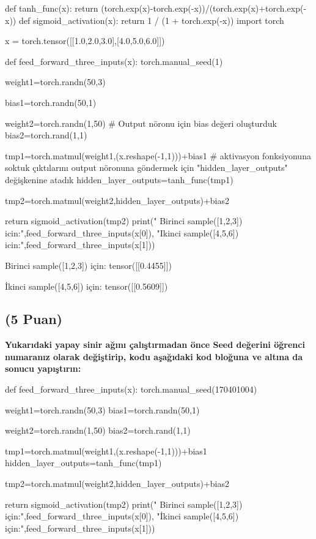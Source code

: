 \documentclass[11pt]{article}
\begin{document}
\begin{python}
def tanh_func(x):
    return (torch.exp(x)-torch.exp(-x))/(torch.exp(x)+torch.exp(-x))
def sigmoid_activation(x):
    return 1 / (1 + torch.exp(-x))
import torch


x = torch.tensor([[1.0,2.0,3.0],[4.0,5.0,6.0]])

def feed_forward_three_inputs(x):
    torch.manual_seed(1)
    
    
    weight1=torch.randn(50,3)
    
    bias1=torch.randn(50,1)
    
    
    weight2=torch.randn(1,50)
    # Output nöronu için bias değeri oluşturduk
    bias2=torch.rand(1,1)
    
    
    tmp1=torch.matmul(weight1,(x.reshape(-1,1)))+bias1
    # aktivasyon fonksiyonuna soktuk çıktılarını output nöronuna göndermek için "hidden_layer_outputs" değişkenine atadık
    hidden_layer_outputs=tanh_func(tmp1)
    
    
    tmp2=torch.matmul(weight2,hidden_layer_outputs)+bias2
    
    return sigmoid_activation(tmp2)
print(" Birinci sample([1,2,3]) icin:",feed_forward_three_inputs(x[0]), "\n Ikinci  sample([4,5,6]) icin:",feed_forward_three_inputs(x[1]))

\end{python}

\item Birinci sample([1,2,3]) için: tensor([[0.4455]]) 
 \item İkinci  sample([4,5,6]) için: tensor([[0.5609]])

\subsection{(5 Puan)} \textbf{Yukarıdaki yapay sinir ağını çalıştırmadan önce Seed değerini öğrenci numaranız olarak değiştirip, kodu aşağıdaki kod bloğuna ve altına da sonucu yapıştırın:}

\begin{python}
def feed_forward_three_inputs(x):
    torch.manual_seed(170401004)
    

    weight1=torch.randn(50,3)
    bias1=torch.randn(50,1)
    

    weight2=torch.randn(1,50)
    bias2=torch.rand(1,1)

    tmp1=torch.matmul(weight1,(x.reshape(-1,1)))+bias1
    hidden_layer_outputs=tanh_func(tmp1)
    
    tmp2=torch.matmul(weight2,hidden_layer_outputs)+bias2

    return sigmoid_activation(tmp2)
print(" Birinci sample([1,2,3]) için:",feed_forward_three_inputs(x[0]), "\n İkinci  sample([4,5,6]) için:",feed_forward_three_inputs(x[1]))
\end{python}
\end{document}
